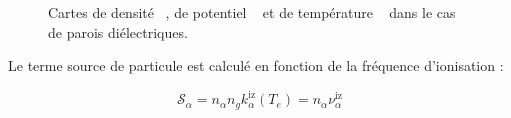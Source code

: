 \begin{refsection}
\begin{figure}[!htbp]
    \centering
    \caption{Cartes de densité ~, de potentiel
    ~ et de température
    ~ dans le cas de parois
    diélectriques.}
    \label{2-CartesWithTe}
\end{figure}

Le terme source de particule est calculé en fonction de la fréquence
d'ionisation :

\begin{equation*}
\mathcal{S}_{\alpha}=n_\alpha n_g
k_{\alpha}^\text{iz}(T_e)=n_\alpha\nu_{\alpha}^\text{iz}
\end{equation*}


\end{refsection}
